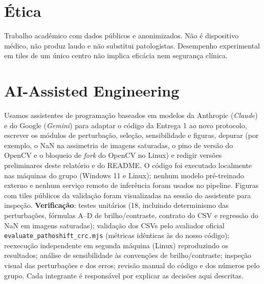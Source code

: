 \documentclass[10pt,conference]{IEEEtran}
\newcommand{\cfg}[1]{\texttt{#1}}
\begin{document}
\section{Ética}
Trabalho acadêmico com dados públicos e anonimizados. Não é dispositivo médico, não produz laudo e não substitui patologistas. Desempenho experimental em tiles de um único centro não implica eficácia nem segurança clínica.

\section{AI-Assisted Engineering}
Usamos assistentes de programação baseados em modelos da Anthropic (\emph{Claude}) e do Google (\emph{Gemini}) para adaptar o código da Entrega 1 ao novo protocolo, escrever os módulos de perturbação, seleção, sensibilidade e figuras, depurar (por exemplo, o NaN na assimetria de imagens saturadas, o pino de versão do OpenCV e o bloqueio de \emph{fork} do OpenCV no Linux) e redigir versões preliminares deste relatório e do README. O código foi executado localmente nas máquinas do grupo (Windows 11 e Linux); nenhum modelo pré-treinado externo e nenhum serviço remoto de inferência foram usados no pipeline. Figuras com tiles públicos da validação foram visualizadas na sessão do assistente para inspeção. \textbf{Verificação}: testes unitários (18, incluindo determinismo das perturbações, fórmulas A--D de brilho/contraste, contrato do CSV e regressão do NaN em imagens saturadas); validação dos CSVs pelo avaliador oficial \cfg{evaluate\_pathoshift\_crc.mjs} (métricas idênticas às do nosso código); reexecução independente em segunda máquina (Linux) reproduzindo os resultados; análise de sensibilidade às convenções de brilho/contraste; inspeção visual das perturbações e dos erros; revisão manual do código e dos números pelo grupo. Cada integrante é responsável por explicar as decisões aqui descritas.




\appendix
\end{document}
